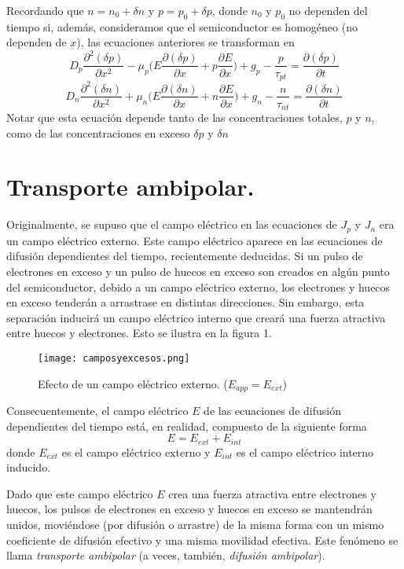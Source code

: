 \documentclass[12pt,a4paper]{article}
\begin{document}
Recordando que $n=n_{0} + \delta n$ y $p=p_{0} + \delta p$, donde $n_{0}$ y $p_{0}$ no dependen del tiempo si, además, consideramos que el semiconductor es homogéneo (no dependen de $x$), las ecuaciones anteriores se transforman en
\[ D_{p} \frac{\partial^{2}(\delta p)}{\partial x^{2}}- \mu _{p} \bigg( E \frac{\partial (\delta p)}{\partial x} + p \frac{\partial E}{\partial x} \bigg) + g_{p} - \frac{p}{\tau _{pt}} = \frac{\partial (\delta p)}{\partial t} \]
\[ D_{n} \frac{\partial^{2}(\delta n)}{\partial x^{2}}+ \mu _{n} \bigg( E \frac{\partial (\delta n)}{\partial x} + n \frac{\partial E}{\partial x} \bigg) + g_{n} - \frac{n}{\tau _{nt}} = \frac{\partial (\delta n)}{\partial t} \]
Notar que esta ecuación depende tanto de las concentraciones totales, $p$ y $n$, como de las concentraciones en exceso $\delta p$ y $\delta n$

\section{Transporte ambipolar.}

Originalmente, se supuso que el campo eléctrico en las ecuaciones de $J_{p}$ y $J_{n}$ era un campo eléctrico externo. Este campo eléctrico aparece en las ecuaciones de difusión dependientes del tiempo, recientemente deducidas. Si un pulso de electrones en exceso y un pulso de huecos en exceso son creados en algún punto del semiconductor, debido a un campo eléctrico externo, los electrones y huecos en exceso tenderán a arrastrase en distintas direcciones. Sin embargo, esta separación inducirá un campo eléctrico interno que creará una fuerza atractiva entre huecos y electrones. Esto se ilustra en la figura 1.

\begin{figure}[ht!]
\begin{center}
\texttt{[image: camposyexcesos.png]}
\caption{Efecto de un campo eléctrico externo. ($E_{app}=E_{ext}$)}
\end{center}
\end{figure}

Consecuentemente, el campo eléctrico $E$ de las ecuaciones de difusión dependientes del tiempo está, en realidad, compuesto de la siguiente forma
\[ E=E_{ext}+E_{int} \]
donde $E_{ext}$ es el campo eléctrico externo y $E_{int}$ es el campo eléctrico interno inducido.

Dado que este campo eléctrico $E$ crea una fuerza atractiva entre electrones y huecos, los pulsos de electrones en exceso y huecos en exceso se mantendrán unidos, moviéndose (por difusión o arrastre) de la misma forma con un mismo coeficiente de difusión efectivo y una misma movilidad efectiva. Este fenómeno se llama \emph{transporte ambipolar} (a veces, también, \emph{difusión ambipolar}).
\end{document}
